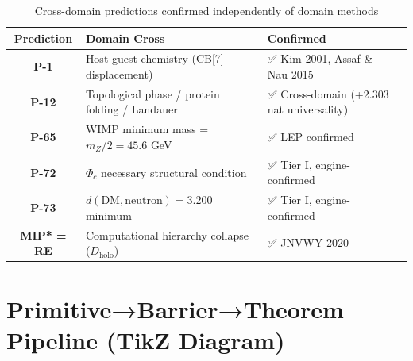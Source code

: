 \documentclass[11pt,a4paper]{article}
\begin{document}
\begin{table}[h!]
\centering
\caption{Cross-domain predictions confirmed independently of domain methods}
\label{tab:predictions}
\begin{tabular}{c l l c}
\toprule
\textbf{Prediction} & \textbf{Domain Cross} & \textbf{Confirmed} \\
\midrule
\textbf{P-1} & Host-guest chemistry (CB[7] displacement) & ✅ Kim 2001, Assaf \& Nau 2015 \\
\textbf{P-12} & Topological phase / protein folding / Landauer & ✅ Cross-domain (+2.303 nat universality) \\
\textbf{P-65} & WIMP minimum mass = $m_Z/2 = 45.6$ GeV & ✅ LEP confirmed \\
\textbf{P-72} & $\Phi_c$ necessary structural condition & ✅ Tier I, engine-confirmed \\
\textbf{P-73} & $d(\text{DM}, \text{neutron}) = 3.200$ minimum & ✅ Tier I, engine-confirmed \\
\textbf{MIP* = RE} & Computational hierarchy collapse ($D_{\text{holo}}$) & ✅ JNVWY 2020 \\
\bottomrule
\end{tabular}
\end{table}

\section{Primitive→Barrier→Theorem Pipeline (TikZ Diagram)}
\end{document}
